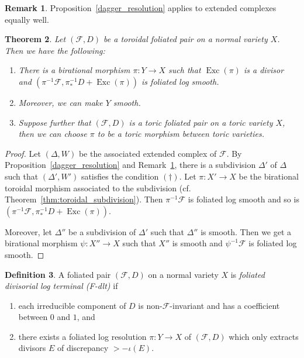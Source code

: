 \documentclass[12pt,reqno]{amsart}
\newtheorem{theorem}{Theorem}[section]
\theoremstyle{definition}
\newtheorem{definition}[theorem]{Definition}
\newtheorem{remark}[theorem]{Remark}
\newcommand{\on}{\operatorname}
\newcommand\cF{{\mathcal{F}}}
\begin{document}
\begin{remark}\label{rem:dagger_for_conical_complex}
    Proposition~\ref{dagger_resolution} applies to extended complexes equally well.
\end{remark}

\begin{theorem}\label{FLogRes}
    Let $(\cF,D)$ be a toroidal foliated pair on a normal variety $X$.
    Then we have the following:
    \begin{enumerate}
        \item There is a birational morphism $\pi\colon Y \to X$ such that $\on{Exc}(\pi)$ is a divisor and $(\pi^{-1}\cF,\pi_*^{-1}D+\on{Exc}(\pi))$ is foliated log smooth.
        \item Moreover, we can make $Y$ smooth. 
        \item Suppose further that $(\cF,D)$ is a toric foliated pair on a toric variety $X$, then we can choose $\pi$ to be a toric morphism between toric varieties.
    \end{enumerate}
\end{theorem}
\begin{proof}
    Let $(\Delta,W)$ be the associated extended complex of $\cF$. 
    By Proposition~\ref{dagger_resolution} and Remark~\ref{rem:dagger_for_conical_complex}, there is a subdivision $\Delta'$ of $\Delta$ such that $(\Delta',W')$ satisfies the condition $(\dagger)$. 
    Let $\pi\colon X'\to X$ be the birational toroidal morphism associated to the subdivision (cf. Theorem~\ref{thm:toroidal_subdivision}). 
    Then $\pi^{-1}\cF$ is foliated log smooth and so is $(\pi^{-1}\cF,\pi_*^{-1}D+\on{Exc}(\pi))$. 

    Moreover, let $\Delta''$ be a subdivision of $\Delta'$ such that $\Delta''$ is smooth. 
    Then we get a birational morphism $\psi\colon X''\to X$ such that $X''$ is smooth and $\psi^{-1}\cF$ is foliated log smooth. 
\end{proof}


\begin{definition}\label{defn_F_dlt}
    A foliated pair $(\cF,D)$ on a normal variety $X$ is \emph{foliated divisorial log terminal (F-dlt)} if 
    \begin{enumerate}
        \item each irreducible component of $D$ is non-$\cF$-invariant and has a coefficient between $0$ and $1$, and 
        \item there exists a foliated log resolution $\pi\colon Y\to X$ of $(\cF,D)$ which only extracts divisors $E$ of discrepancy $> -\iota(E)$.
    \end{enumerate}
\end{definition}
\end{document}
